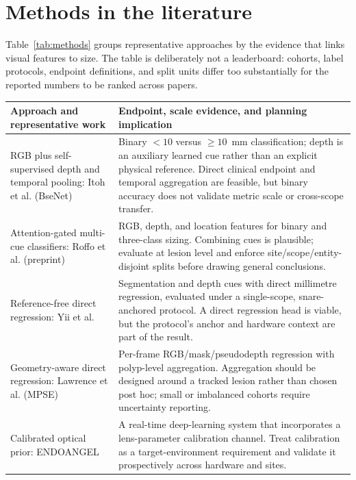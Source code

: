 \documentclass[11pt]{article}
\begin{document}
\section{Methods in the literature}

Table~\ref{tab:methods} groups representative approaches by the evidence that
links visual features to size. The table is deliberately not a leaderboard:
cohorts, label protocols, endpoint definitions, and split units differ too
substantially for the reported numbers to be ranked across papers.

\begin{table}[t]
\centering
\footnotesize
\setlength{\tabcolsep}{5pt}
\begin{tabularx}{\textwidth}{@{}p{}X@{}}
\toprule
\textbf{Approach and representative work} & \textbf{Endpoint, scale evidence, and planning implication} \\
\midrule
RGB plus self-supervised depth and temporal pooling: Itoh et al. (BseNet) \cite{itoh2018bsenet} & Binary $<10$ versus $\geq10$~mm classification; depth is an auxiliary learned cue rather than an explicit physical reference. Direct clinical endpoint and temporal aggregation are feasible, but binary accuracy does not validate metric scale or cross-scope transfer. \\

Attention-gated multi-cue classifiers: Roffo et al. \cite{roffo2024hag} (preprint) & RGB, depth, and location features for binary and three-class sizing. Combining cues is plausible; evaluate at lesion level and enforce site/scope/entity-disjoint splits before drawing general conclusions. \\

Reference-free direct regression: Yii et al. \cite{yii2025referencefree} & Segmentation and depth cues with direct millimetre regression, evaluated under a single-scope, snare-anchored protocol. A direct regression head is viable, but the protocol's anchor and hardware context are part of the result. \\

Geometry-aware direct regression: Lawrence et al. (MPSE) \cite{lawrence2026mpse} & Per-frame RGB/mask/pseudodepth regression with polyp-level aggregation. Aggregation should be designed around a tracked lesion rather than chosen post hoc; small or imbalanced cohorts require uncertainty reporting. \\

Calibrated optical prior: ENDOANGEL \cite{wang2024endoangel} & A real-time deep-learning system that incorporates a lens-parameter calibration channel. Treat calibration as a target-environment requirement and validate it prospectively across hardware and sites. \\


\end{tabularx}
\end{table}
\end{document}
